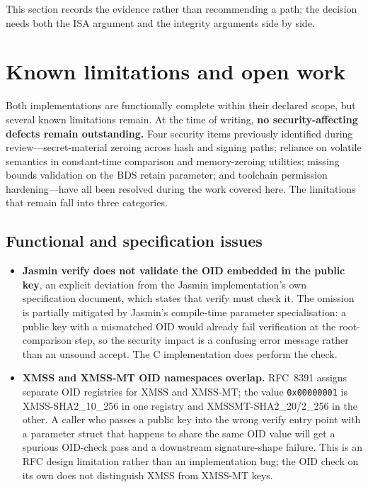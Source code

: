 \documentclass[11pt,a4paper]{article}
\begin{document}
This section records the evidence rather than recommending a path;
the decision needs both the ISA argument and the integrity
arguments side by side.

\section{Known limitations and open work}

Both implementations are functionally complete within their
declared scope, but several known limitations remain. At the
time of writing, \textbf{no security-affecting defects remain
outstanding.} Four
security items previously identified during review---secret-material
zeroing across hash and signing paths; reliance on volatile
semantics in constant-time comparison and memory-zeroing utilities;
missing bounds validation on the BDS retain parameter; and toolchain
permission hardening---have all been resolved during the work
covered here. The limitations that remain fall into three
categories.

\subsection{Functional and specification issues}

\begin{itemize}[nosep]
  \item \textbf{Jasmin verify does not validate the OID embedded in
    the public key}, an explicit deviation from the Jasmin
    implementation's own specification document, which states that
    verify must check it. The omission is partially mitigated by
    Jasmin's compile-time parameter specialisation: a public key
    with a mismatched OID would already fail verification at the
    root-comparison step, so the security impact is a confusing
    error message rather than an unsound accept. The C
    implementation does perform the check.
  \item \textbf{XMSS and XMSS-MT OID namespaces overlap.}
    RFC~8391 assigns separate OID registries for XMSS and XMSS-MT;
    the value \texttt{0x00000001} is XMSS-SHA2\_10\_256 in one
    registry and XMSSMT-SHA2\_20/2\_256 in the other. A caller who
    passes a public key into the wrong verify entry point with a
    parameter struct that happens to share the same OID value will
    get a spurious OID-check pass and a downstream signature-shape
    failure. This is an RFC design limitation rather than an
    implementation bug; the OID check on its own does not
    distinguish XMSS from XMSS-MT keys.
\end{itemize}
\end{document}
